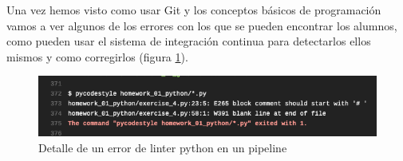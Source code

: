 Una vez hemos visto como usar Git y los conceptos básicos de programación vamos a ver algunos de los errores con los que se pueden encontrar los alumnos, como pueden usar el sistema de integración continua para detectarlos ellos mismos y como corregirlos (figura \ref{fig:linter_error_python}).

\begin{figure}[H]
\centering
\includegraphics[width=1.0\textwidth]{../images/linter_error_python}
\caption{Detalle de un error de linter python en un pipeline}
\label{fig:linter_error_python}
\end{figure}


